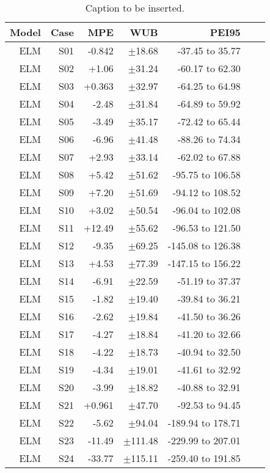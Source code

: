 \begin{table}
\centering
\caption{Caption to be inserted.}
\label{uncertainty_table__models}
\begin{tabular}{rrrrrrr}
\toprule
Model & Case &    MPE &         WUB &             PEI95 \\
\midrule
  ELM &  S01 & -0.842 &  $\pm$18.68 &   -37.45 to 35.77 \\
  ELM &  S02 &  +1.06 &  $\pm$31.24 &   -60.17 to 62.30 \\
  ELM &  S03 & +0.363 &  $\pm$32.97 &   -64.25 to 64.98 \\
  ELM &  S04 &  -2.48 &  $\pm$31.84 &   -64.89 to 59.92 \\
  ELM &  S05 &  -3.49 &  $\pm$35.17 &   -72.42 to 65.44 \\
  ELM &  S06 &  -6.96 &  $\pm$41.48 &   -88.26 to 74.34 \\
  ELM &  S07 &  +2.93 &  $\pm$33.14 &   -62.02 to 67.88 \\
  ELM &  S08 &  +5.42 &  $\pm$51.62 &  -95.75 to 106.58 \\
  ELM &  S09 &  +7.20 &  $\pm$51.69 &  -94.12 to 108.52 \\
  ELM &  S10 &  +3.02 &  $\pm$50.54 &  -96.04 to 102.08 \\
  ELM &  S11 & +12.49 &  $\pm$55.62 &  -96.53 to 121.50 \\
  ELM &  S12 &  -9.35 &  $\pm$69.25 & -145.08 to 126.38 \\
  ELM &  S13 &  +4.53 &  $\pm$77.39 & -147.15 to 156.22 \\
  ELM &  S14 &  -6.91 &  $\pm$22.59 &   -51.19 to 37.37 \\
  ELM &  S15 &  -1.82 &  $\pm$19.40 &   -39.84 to 36.21 \\
  ELM &  S16 &  -2.62 &  $\pm$19.84 &   -41.50 to 36.26 \\
  ELM &  S17 &  -4.27 &  $\pm$18.84 &   -41.20 to 32.66 \\
  ELM &  S18 &  -4.22 &  $\pm$18.73 &   -40.94 to 32.50 \\
  ELM &  S19 &  -4.34 &  $\pm$19.01 &   -41.61 to 32.92 \\
  ELM &  S20 &  -3.99 &  $\pm$18.82 &   -40.88 to 32.91 \\
  ELM &  S21 & +0.961 &  $\pm$47.70 &   -92.53 to 94.45 \\
  ELM &  S22 &  -5.62 &  $\pm$94.04 & -189.94 to 178.71 \\
  ELM &  S23 & -11.49 & $\pm$111.48 & -229.99 to 207.01 \\
  ELM &  S24 & -33.77 & $\pm$115.11 & -259.40 to 191.85 \\

\end{tabular}
\end{table}
